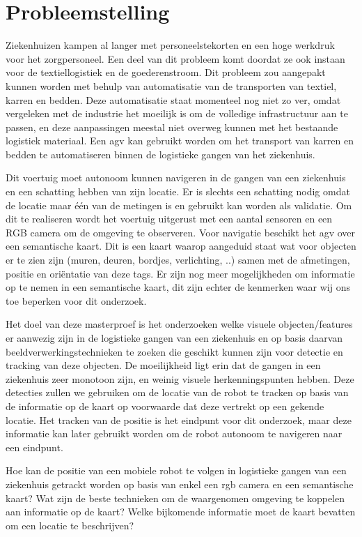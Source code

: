 
\chapter{Probleemstelling}

Ziekenhuizen kampen al langer met personeelstekorten en een hoge werkdruk voor het zorgpersoneel. Een deel van dit probleem komt doordat ze ook instaan voor de textiellogistiek en de goederenstroom.
Dit probleem zou aangepakt kunnen worden met behulp van automatisatie van de transporten van textiel, karren en bedden. Deze automatisatie staat momenteel nog niet zo ver, omdat vergeleken met de industrie het moeilijk is om de volledige
infrastructuur aan te passen, en deze aanpassingen meestal niet overweg kunnen met het bestaande logistiek materiaal. Een \gls{agv} kan gebruikt worden om het transport van karren en bedden te automatiseren binnen de logistieke gangen van het ziekenhuis.

Dit voertuig moet autonoom kunnen navigeren in de gangen van een ziekenhuis en een schatting hebben van zijn locatie.
Er is slechts een schatting nodig omdat de locatie maar \'{e}\'{e}n van de metingen is en gebruikt kan worden als validatie.
Om dit te realiseren
wordt het voertuig uitgerust met een aantal sensoren en een RGB camera om de omgeving te observeren. Voor navigatie beschikt het \gls{agv}
over een semantische kaart.
Dit is een kaart waarop aangeduid staat wat voor objecten er te zien zijn (muren, deuren, bordjes, verlichting, ..) samen met de afmetingen, positie en ori\"{e}ntatie van deze tags.
Er zijn nog meer mogelijkheden om informatie op te nemen in een semantische kaart, dit zijn echter de kenmerken waar wij ons toe beperken voor dit onderzoek.

Het doel van deze masterproef is het onderzoeken welke visuele objecten/features er aanwezig zijn in de logistieke gangen van een ziekenhuis en op basis daarvan
beeldverwerkingstechnieken te zoeken die geschikt kunnen zijn voor detectie en tracking van deze objecten.
De moeilijkheid ligt erin dat de gangen in een ziekenhuis zeer monotoon zijn, en weinig visuele herkenningspunten hebben.
Deze detecties zullen we gebruiken om de locatie van de robot te tracken op basis van de informatie op de kaart op voorwaarde dat deze vertrekt op een gekende locatie.
Het tracken van de positie is het eindpunt voor dit onderzoek, maar deze informatie kan later gebruikt worden om de robot autonoom te navigeren naar een eindpunt.

Hoe kan de positie van een mobiele robot te volgen in logistieke gangen van een ziekenhuis getrackt worden op basis van enkel een \gls{rgb} camera en een
semantische kaart?
Wat zijn de beste technieken om de waargenomen omgeving te koppelen aan informatie op de kaart?
Welke bijkomende informatie moet de kaart bevatten om een locatie te beschrijven?